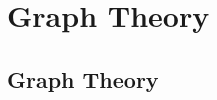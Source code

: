 \documentclass[../maths.tex]{subfiles}
\begin{document}
\chapter{Graph Theory}
\section{Graph Theory}
\end{document}
